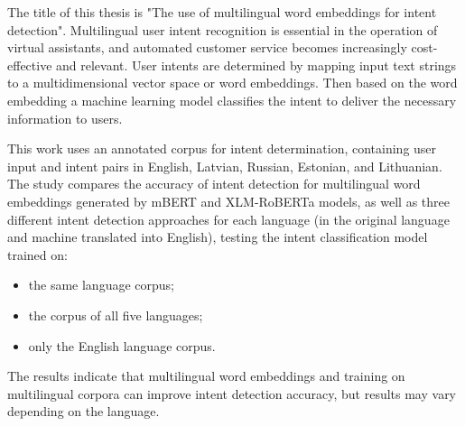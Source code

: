 The title of this thesis is "The use of multilingual word embeddings for intent detection". Multilingual user intent recognition is essential in the operation of virtual assistants, and automated customer service becomes increasingly cost-effective and relevant. User intents are determined by mapping input text strings to a multidimensional vector space or word embeddings. Then based on the word embedding a machine learning model classifies the intent to deliver the necessary information to users.

This work uses an annotated corpus for intent determination, containing user input and intent pairs in English, Latvian, Russian, Estonian, and Lithuanian. The study compares the accuracy of intent detection for multilingual word embeddings generated by mBERT and XLM-RoBERTa models, as well as three different intent detection approaches for each language (in the original language and machine translated into English), testing the intent classification model trained on:

\begin{itemize}
    \item the same language corpus;
    \item the corpus of all five languages;
    \item only the English language corpus.
\end{itemize}

The results indicate that multilingual word embeddings and training on multilingual corpora can improve intent detection accuracy, but results may vary depending on the language.


